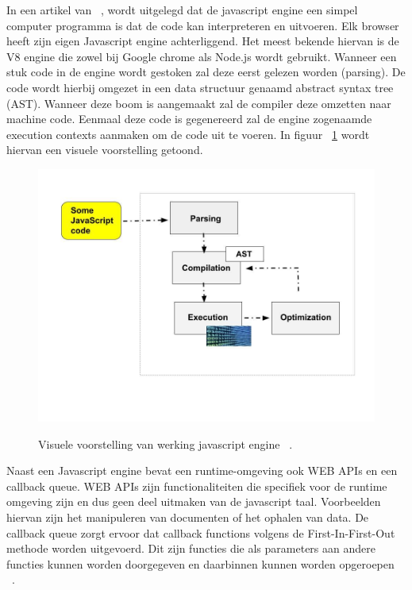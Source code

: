 In een artikel van ~\textcite{Christopher}, 
wordt uitgelegd dat de javascript engine een simpel computer programma is dat de code kan interpreteren en uitvoeren.
Elk browser heeft zijn eigen Javascript engine achterliggend. Het meest bekende hiervan is de
V8 engine die zowel bij Google chrome als Node.js wordt gebruikt. 
Wanneer een stuk code in de engine wordt gestoken zal deze eerst gelezen worden (parsing). 
De code wordt hierbij omgezet in een data structuur genaamd abstract syntax tree (AST).
Wanneer deze boom is aangemaakt zal de compiler deze omzetten naar machine code. 
Eenmaal deze code is gegenereerd zal de engine zogenaamde execution contexts aanmaken om de code uit te voeren.
In figuur ~\ref{fig:javascriptengine} wordt hiervan een visuele voorstelling getoond.
\begin{figure}[H]
    \centering
    \includegraphics[width=.9\textwidth]{graphics/javascriptengine.jpeg}
    \caption{\label{fig:javascriptengine}}Visuele voorstelling van werking javascript engine ~\autocite{Christopher}.
\end{figure}

Naast een Javascript engine bevat een runtime-omgeving ook WEB APIs en een callback queue. 
WEB APIs zijn functionaliteiten die specifiek voor de runtime omgeving zijn en dus geen deel uitmaken van de javascript taal.
Voorbeelden hiervan zijn het manipuleren van documenten of het ophalen van data.
De callback queue zorgt ervoor dat callback functions volgens de First-In-First-Out methode worden uitgevoerd.
Dit zijn functies die als parameters aan andere functies kunnen worden doorgegeven en daarbinnen kunnen worden opgeroepen ~\autocite{Eygi2020}.

